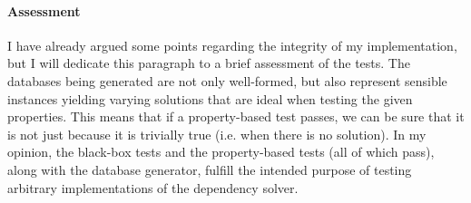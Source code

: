 \paragraph{Assessment}
I have already argued some points regarding the integrity of my implementation, but I will dedicate this paragraph to a brief assessment of the tests. The databases being generated are not only well-formed, but also represent sensible instances yielding varying solutions that are ideal when testing the given properties. This means that if a property-based test passes, we can be sure that it is not just because it is trivially true (i.e. when there is no solution). In my opinion, the black-box tests and the property-based tests (all of which pass), along with the database generator, fulfill the intended purpose of testing arbitrary implementations of the dependency solver.
